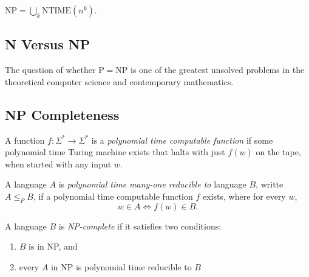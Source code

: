 \documentclass[11pt]{article}
\begin{document}
\begin{corollary}
$\mathrm{NP} = \bigcup_k \mathrm{NTIME}(n^k)$.
\end{corollary}

\subsection{N Versus NP}

The question of whether $\mathrm{P} = \mathrm{NP}$ is one of the greatest unsolved problems in the theoretical
computer science and contemporary mathematics.

\subsection{NP Completeness}

\begin{definition}
A function $f: \Sigma^\ast \rightarrow \Sigma^\ast$ is a \emph{polynomial time computable function} if
some polynomial time Turing machine exists that halts with just $f(w)$ on the tape, when started
with any input $w$.
\end{definition}

\begin{definition}
A language $A$ is \emph{polynomial time many-one reducible to} language $B$, writte $A \leq_P B$,
if a polynomial time computable function $f$ exists, where for every $w$,
\[
  w \in A \Leftrightarrow f(w) \in B.
\]
\end{definition}

\begin{definition}
A language $B$ is \emph{NP-complete} if it satisfies two conditions:
\begin{enumerate}
\item $B$ is in NP, and
\item every $A$ in NP is polynomial time reducible to $B$
\end{enumerate}
\end{definition}
\end{document}
